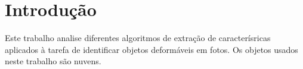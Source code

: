 \chapter{Introdução}

Este trabalho analise diferentes algoritmos de extração de caracterísricas
aplicados à tarefa de identificar objetos deformáveis em fotos. Os objetos usados neste
trabalho são nuvens.
